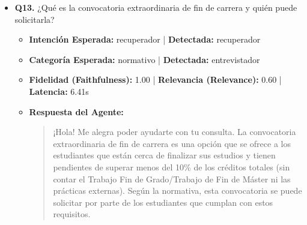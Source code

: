 \documentclass[12pt,a4paper,oneside]{report}
\begin{document}
\begin{itemize}
  
\item \textbf{Q13.} ¿Qué es la convocatoria extraordinaria de fin de carrera y quién puede solicitarla? \\
        \begin{itemize}
          \item \textbf{Intención Esperada:} recuperador | \textbf{Detectada:} recuperador
          \item \textbf{Categoría Esperada:} normativo | \textbf{Detectada:} entrevistador
          \item \textbf{Fidelidad (Faithfulness):} 1.00 | \textbf{Relevancia (Relevance):} 0.60 | \textbf{Latencia:} 6.41s
          \item \textbf{{Respuesta del Agente:}} \\
                \begin{quote}
¡Hola! Me alegra poder ayudarte con tu consulta. La convocatoria extraordinaria de fin de carrera es una opción que se ofrece a los estudiantes que están cerca de finalizar sus estudios y tienen pendientes de superar menos del 10\% de los créditos totales (sin contar el Trabajo Fin de Grado/Trabajo de Fin de Máster ni las prácticas externas). Según la normativa, esta convocatoria se puede solicitar por parte de los estudiantes que cumplan con estos requisitos.


\end{quote}
\end{itemize}
\end{itemize}
\end{document}
